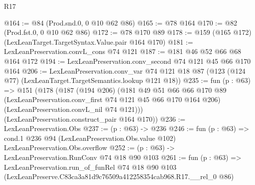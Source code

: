 \begin{lexlean}{R17}
\begin{coremodule}
@164 := @84 (Prod.snd.{0, 0} @10 @62 @86)
@165 := @78 @164
@170 := @82 (Prod.fst.{0, 0} @10 @62 @86)
@172 := @78 @170 @89
@178 := @159 (@165 @172) (LexLeanTarget.TargetSyntax.Value.pair @164 @170)
@181 := LexLeanPreservation.convL_cons @74 @121
@187 := @181 @46 @52 @66 @68 @164 @172
@194 := LexLeanPreservation.conv_second @74 @121 @45 @66 @170 @164
@206 := LexLeanPreservation.conv_var
    @74
    @121
    @18
    @87
    (@123 (@124 @77) (LexLeanTarget.TargetSemantics.lookup @121 @18))
@235 := fun (p : @63) =>
  @151
    (@178
      (@187
        (@194 @206)
        (@181
          @49
          @51
          @66
          @66
          @170
          @89
          (LexLeanPreservation.conv_first @74 @121 @45 @66 @170 @164 @206)
          (LexLeanPreservation.convL_nil @74 @121)))
      (LexLeanPreservation.construct_pair @164 @170))
@236 := LexLeanPreservation.Obs
@237 := (p : @63) -> @236
@246 := fun (p : @63) =>
  cond.{1} @236 @94 (LexLeanPreservation.Obs.value @102) LexLeanPreservation.Obs.overflow
@252 := (p : @63) -> LexLeanPreservation.RunConv @74 @18 @90 @103
@261 := fun (p : @63) =>
  LexLeanPreservation.run_of_funRel
    @74
    @18
    @90
    @103
    (LexLeanPreserve.C83ca3a81d9c76509a412258354cab968.R17.__rel_0 @86)
\end{coremodule}
\end{lexlean}
